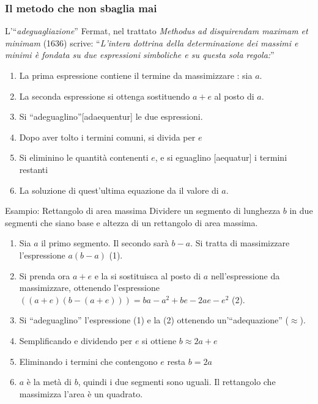 \begin{frame}[label=Fermat-metodo]
    \frametitle{Il metodo che non sbaglia mai}
    \begin{block}{L'``\textit{adeguagliazione}''\cite{Giorello}}
        Fermat, nel trattato \textit{Methodus ad disquirendam maximam et minimam} (1636) scrive:
        ``\textit{L'intera dottrina della determinazione dei massimi e minimi è
        fondata su due espressioni simboliche e su questa sola regola:}''
        \begin{enumerate}
        \item<1-> La prima espressione contiene il termine da massimizzare : sia $a$.
        \item<2-> La seconda espressione si ottenga sostituendo $a+e$ al posto di $a$.
        \item<3-> Si ``\alert{adeguaglino}''[adaequentur] le due espressioni.
        \item<4-> Dopo aver tolto i termini comuni, si divida per $e$
        \item<5-> Si eliminino le quantità contenenti $e$, e si eguaglino [aequatur] i termini restanti
        \item<6-> La soluzione di quest'ultima equazione da il valore di $a$.
        \end{enumerate}
    \end{block}
    \pause

    \begin{exampleblock}{Esampio: Rettangolo di area massima}
    Dividere un segmento di lunghezza $b$ in due segmenti che siano base e altezza 
    di un rettangolo di area massima.
    \begin{enumerate}
        \item Sia $a$ il primo segmento. Il secondo sarà $b-a$. Si tratta di massimizzare l'espressione $a(b-a)$ (1).
        \item Si prenda ora $a+e$ e la si sostituisca al posto di $a$ nell'espressione da massimizzare, ottenendo
    l'espressione $((a+e)(b-(a+e))) = ba - a^2 +be -2ae -e^2$ (2).
    \item Si ``\alert{adeguaglino}'' l'espressione (1) e la (2) ottenendo un'``\alert{adequazione}'' ($\approx$).
    \item Semplificando e dividendo per $e$ si ottiene $b \approx 2a + e$
    \item Eliminando i termini che contengono $e$ resta $b = 2a$ 
    \item $a$ è la metà di $b$, quindi i due segmenti sono uguali. Il rettangolo che massimizza l'area è un quadrato.    
    \end{enumerate}
    \end{exampleblock}    

\end{frame}